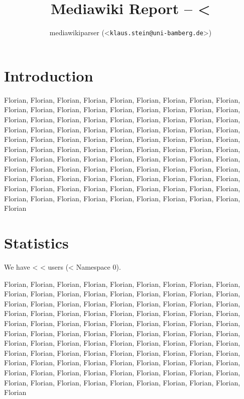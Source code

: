 \documentclass{scrartcl}
\title{Mediawiki Report -- <%
}
\author{mediawikiparser (<\texttt{klaus.stein@uni-bamberg.de}>)}
\begin{document}
\maketitle

\section{Introduction} %
\label{sec:introduction}

Florian, Florian, Florian, Florian, Florian, Florian, Florian, Florian, Florian, Florian, Florian, Florian, Florian, Florian, Florian, Florian, Florian, Florian, Florian, Florian, Florian, Florian, Florian, Florian, Florian, Florian, Florian, Florian, Florian, Florian, Florian, Florian, Florian, Florian, Florian, Florian, Florian, Florian, Florian, Florian, Florian, Florian, Florian, Florian, Florian, Florian, Florian, Florian, Florian, Florian, Florian, Florian, Florian, Florian, Florian, Florian, Florian, Florian, Florian, Florian, Florian, Florian, Florian, Florian, Florian, Florian, Florian, Florian, Florian, Florian, Florian, Florian, Florian, Florian, Florian, Florian, Florian, Florian, Florian, Florian, Florian, Florian, Florian, Florian, Florian, Florian, Florian, Florian, Florian, Florian, Florian, Florian, Florian, Florian, Florian, Florian, Florian, Florian, Florian, Florian


\section{Statistics} %
\label{sec:statistics}

We have <%
<%
users (<%
Namespace 0).

Florian, Florian, Florian, Florian, Florian, Florian, Florian, Florian, Florian, Florian, Florian, Florian, Florian, Florian, Florian, Florian, Florian, Florian, Florian, Florian, Florian, Florian, Florian, Florian, Florian, Florian, Florian, Florian, Florian, Florian, Florian, Florian, Florian, Florian, Florian, Florian, Florian, Florian, Florian, Florian, Florian, Florian, Florian, Florian, Florian, Florian, Florian, Florian, Florian, Florian, Florian, Florian, Florian, Florian, Florian, Florian, Florian, Florian, Florian, Florian, Florian, Florian, Florian, Florian, Florian, Florian, Florian, Florian, Florian, Florian, Florian, Florian, Florian, Florian, Florian, Florian, Florian, Florian, Florian, Florian, Florian, Florian, Florian, Florian, Florian, Florian, Florian, Florian, Florian, Florian, Florian, Florian, Florian, Florian, Florian, Florian, Florian, Florian, Florian, Florian
\end{document}
